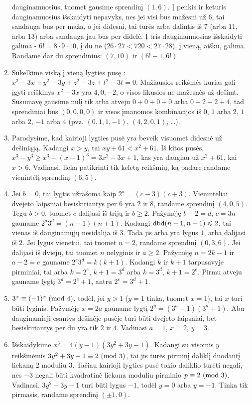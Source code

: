 \begin{enumerate}
dauginamuosius, tuomet gausime sprendinį $(1,6)$. Į penkis ir keturis
dauginamuosius išskaidyti nepavyks, nes jei visi bus mažesni už
$6$, tai sandauga bus per maža, o jei didesni, tai turės arba dalintis
iš $7$ (arba $11$, arba $13$) arba sandauga jau bus per didelė. Į tris
dauginamuosius išskaidyti galima - $6! = 8\cdot 9 \cdot 10$, į du ne
($26\cdot27 < 720 < 27\cdot 28$), į vieną, aišku, galima. Randame dar
du sprendinius: $(7,10)$ ir $(6!-1, 6!)$
\item 
Sukelkime viską į vieną lygties pusę : $x^2 - 3x + y^2 - 3y + z^2 - 3z
+ t^2 - 3t = 0$. Mažiausios reikšmės kurias gali įgyti reiškinys
$x^2 - 3x$ yra $4, 0, -2$, o visos likusios ne mažesnės už dešimt.
Susumavę gausime nulį tik arba atveju $0+0+0+0$ arba $0-2-2+4$, tad
sprendiniai bus $(0,0,0,0)$ ir visos įmanomos kombinacijos iš $0$, $1$
arba $2$, $1$ arba $2$, $-1$ arba $4$ (pvz. $(0,1,1,-1)$, $(4,2,0,1)$,
\ldots).
\item 
Parodysime, kad kairioji lygties pusė yra beveik visuomet didesnė už
dešiniąją. Kadangi $x>y$, tai $xy+61<x^2+61$. Iš kitos pusės,
$x^3-y^3 \geq x^3 - (x-1)^3 = 3x^2 - 3x + 1$, kas yra daugiau už
$x^2 + 61$, kai $x>6$. Vadinasi, lieka patikrinti tik keletą reikšmių,
ką padarę randame vienintėlį sprendinį $(6,5)$.
\item 
Jei $b=0$, tai lygtis užrašoma kaip $2^a = (c-3)(c+3)$. Vienintėliai
dvejeto laipsniai besiskiriantys per $6$ yra $2$ ir $8$, randame
sprendinį $(4,0,5)$. Tegu $b>0$, tuomet $c$ dalijasi iš trijų ir
$b\geq 2$. Pažymėję $b-2 = d$, $c = 3n$ gauname $2^a3^d =
(n-1)(n+1)$. Kadangi $\operatorname{dbd}(n-1, n+1) \leqslant 2$, tai vienas iš dauginamųjų
nesidalija iš $3$. Tada jis arba yra lygus $1$, arba dalijasi iš
$2$. Jei lygus vienetui, tai tuomet $n=2$, randame sprendinį $(0,3,6)$.
Jei dalijasi iš dviejų, tai tuomet $n$ nelyginis ir $a\geq 2$. Pažymėję
$n=2k-1$ ir $a-2 = e$ gauname $2^e3^d = k(k+1)$. Kadangi $k$ ir
$k+1$ tarpusavyje pirminiai, tai arba $k=2^e$, $k+1=3^d$ arba $k=3^d$,
$k+1 = 2^e$. Pirmu atveju gauname lygtį $3^d = 2^e+1$, antru $2^e = 3^d
+ 1$.  
\item 
$3^x \equiv (-1)^x \ (\text{mod } 4)$, todėl, jei $y>1$ ($y=1$ tinka, tuomet
$x=1$), tai $x$ turi būti lyginis. Pažymėję $x=2a$ gauname lygtį
$2^y = (3^a-1)(3^a+1)$. Abu dauginamieji esantys dešinėje pusėje turi
būti dvejeto laipsniai, bet besiskiriantys per du yra tik $2$ ir
$4$. Vadinasi $a=1$, $x=2$, $y=3$.
\item 
Išskaidykime $x^3 = 4(y-1)(3y^2 + 3y -1)$. Kadangi su visomis $y$
reikšmėmis $3y^2 + 3y - 1 \equiv 2 \ (\text{mod } 3)$, tai jis turės pirminį
daliklį duodantį liekaną $2$ moduliu $3$. Tačiau kairioji lygties pusė
tokio daliklio turėti negali, nes $-3$ negali būti kvadratinė liekana
moduliu pirminio $p \equiv 2 \ (\text{mod } 3)$. Vadinasi, $3y^2 + 3y - 1$ turi
būti lygus $-1$, todėl $y=0$ arba $y=-1$. Tinka tik pirmasis, randame
sprendinį $(\pm 1,0)$. 
\end{enumerate} 
